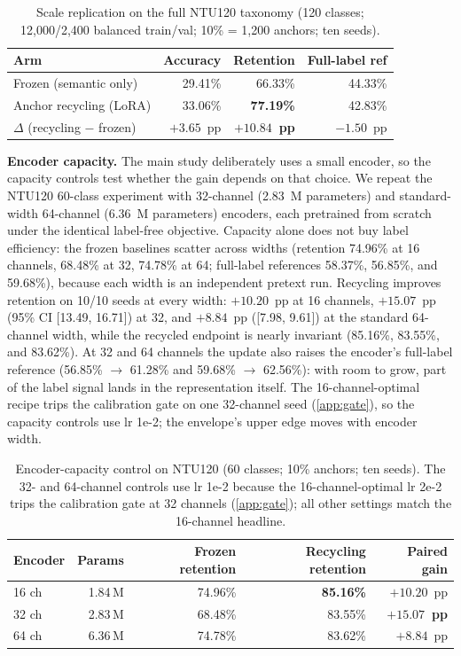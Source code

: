 \documentclass[preprint,12pt,number]{elsarticle}
\begin{document}
\begin{table}[H]
\centering
\caption{Scale replication on the full NTU120 taxonomy (120 classes;
12,000/2,400 balanced train/val; 10\% = 1,200 anchors; ten seeds).}
\label{tab:scale120}
\small
\begin{tabular}{@{}lrrr@{}}
\toprule
Arm & Accuracy & Retention & Full-label ref \\
\midrule
Frozen (semantic only) & 29.41\% & 66.33\% & 44.33\% \\
Anchor recycling (LoRA) & 33.06\% & \textbf{77.19\%} & 42.83\% \\
$\Delta$ (recycling $-$ frozen) & $+3.65$~pp & \textbf{$+10.84$~pp} & $-1.50$~pp \\
\bottomrule
\end{tabular}
\end{table}

\textbf{Encoder capacity.} The main study deliberately uses a small encoder,
so the capacity controls test whether the gain depends on that choice. We
repeat the NTU120 60-class experiment with 32-channel (2.83~M parameters) and
standard-width 64-channel (6.36~M parameters) encoders, each pretrained from
scratch under the identical label-free objective. Capacity alone does not buy
label efficiency: the frozen baselines scatter across widths (retention
74.96\% at 16 channels, 68.48\% at 32, 74.78\% at 64; full-label references
58.37\%, 56.85\%, and 59.68\%), because each width is an independent pretext
run. Recycling improves retention on 10/10 seeds at every width: $+10.20$~pp
at 16 channels, $+15.07$~pp (95\% CI [13.49, 16.71]) at 32, and $+8.84$~pp
([7.98, 9.61]) at the standard 64-channel width, while the recycled endpoint
is nearly invariant (85.16\%, 83.55\%, and 83.62\%). At 32 and 64 channels
the update also raises the encoder's full-label reference (56.85\%
$\rightarrow$ 61.28\% and 59.68\% $\rightarrow$ 62.56\%): with room to grow,
part of the label signal lands in the representation itself. The
16-channel-optimal recipe trips the calibration gate on one 32-channel seed
(\ref{app:gate}), so the capacity controls use lr 1e-2; the envelope's upper
edge moves with encoder width.

\begin{table}[H]
\centering
\caption{Encoder-capacity control on NTU120 (60 classes; 10\% anchors; ten
seeds). The 32- and 64-channel controls use lr 1e-2 because the
16-channel-optimal lr 2e-2 trips the calibration gate at 32 channels
(\ref{app:gate}); all other settings match the 16-channel headline.}
\label{tab:capacity}
\small
\begin{tabular}{@{}lrrrr@{}}
\toprule
Encoder & Params & Frozen retention & Recycling retention & Paired gain \\
\midrule
16 ch & 1.84\,M & 74.96\% & \textbf{85.16\%} & $+10.20$~pp \\
32 ch & 2.83\,M & 68.48\% & 83.55\% & \textbf{$+15.07$~pp} \\
64 ch & 6.36\,M & 74.78\% & 83.62\% & $+8.84$~pp \\
\bottomrule
\end{tabular}
\end{table}
\end{document}
